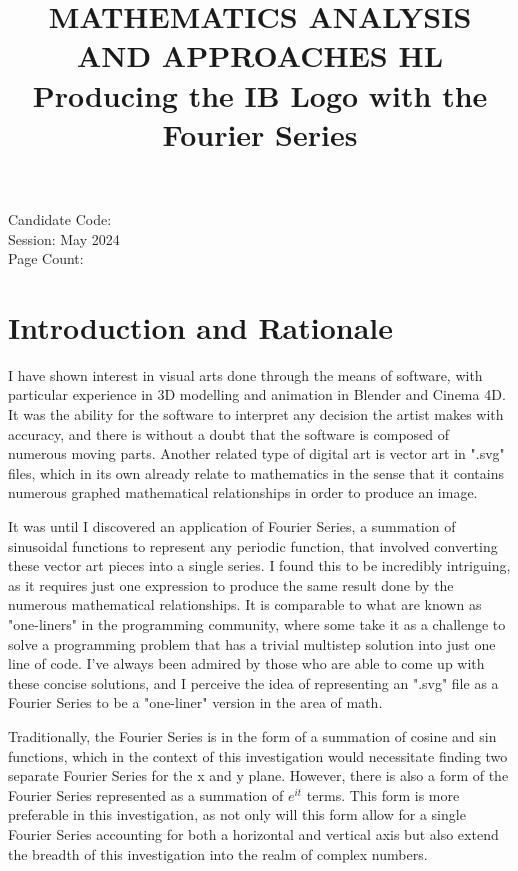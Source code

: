 \documentclass[letterpaper, 12pt]{article}
\title{MATHEMATICS ANALYSIS AND APPROACHES HL
\\
Producing the IB Logo with the Fourier Series}
\author{}
\date{}
\begin{document}
\nocite{*}

\maketitle
\begin{center}
    Candidate Code:
    \\
    Session: May 2024
    \\
    Page Count:
\end{center}
\newpage

\tableofcontents
\newpage


\setcounter{page}{1}

\section{Introduction and Rationale}

I have shown interest in visual arts done through the means of software,
with particular experience in 3D modelling and animation in Blender
and Cinema 4D. It was the ability for the software to interpret
any decision the artist makes with accuracy, and there is without
a doubt that the software is composed of numerous moving parts.
Another related type of digital art is vector art in ".svg" files, which
in its own already relate
to mathematics in the sense that it contains numerous graphed mathematical
relationships in order to produce an image.

It was until I discovered an application of Fourier Series,
a summation of sinusoidal functions to represent any periodic function, that involved converting
these vector art pieces into a single series.
I found this to be incredibly intriguing, as it
requires just one expression to produce the same result done by the numerous mathematical
relationships. It is comparable to what are known as "one-liners"
in the programming community, where some take it as a challenge to
solve a programming problem that has a trivial multistep solution
into just one line of code. I've always been admired by those
who are able to come up with these concise solutions, and I
perceive the idea of representing an ".svg" file as a Fourier Series
to be a "one-liner" version in the area of math.

Traditionally, the Fourier Series is in the form of a summation
of cosine and sin functions, which in the context of this investigation
would necessitate finding two separate Fourier Series for the
x and y plane. However, there is also a form of the Fourier Series
represented as a summation of \(e^{it}\) terms. This
form is more preferable in this investigation, as not only
will this form allow for a single Fourier Series accounting
for both a horizontal and vertical axis but also extend
the breadth of this investigation into the realm of
complex numbers.
\end{document}
